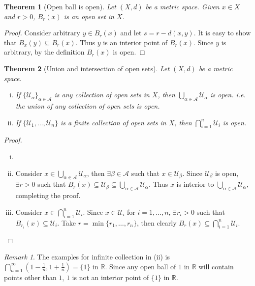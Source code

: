 \documentclass[12pt, lettersize]{book}
\theoremstyle{plain}
\newtheorem{thm}{Theorem}[section]
\theoremstyle{definition}
\theoremstyle{remark}
\newtheorem*{rem}{Remark}
\newcommand{\R}{\mathbb{R}}
\begin{document}
		\begin{thm}[Open ball is open]
			Let $(X,d)$ be a metric space. Given $x\in X$ and $r>0$, $B_r(x)$ is an open set in $X$.
		\end{thm}
		\begin{proof}
			Consider arbitrary $y\in B_r(x)$ and let $s=r-d(x,y)$. It is easy to show that $B_x(y)\subseteq B_r(x)$. Thus $y$ is an interior point of $B_r(x)$. Since $y$ is arbitrary, by the definition $B_r(x)$ is open.
		\end{proof}
		
		\begin{thm}[Union and intersection of open sets]\label{thm: Union and intersection of open sets}
			Let $(X,d)$ be a metric space.
			\begin{enumerate}[(i)]
				\item If $\{\mathcal{U}_\alpha\}_{\alpha\in \mathcal{A}}$ is any collection of open sets in $X$, then $\bigcup_{\alpha\in \mathcal{A}}\mathcal{U}_\alpha$ is open. i.e. the union of \emph{any} collection of open sets is open.
				\item If $\{\mathcal{U}_1,\dots,\mathcal{U}_n\}$ is a finite collection of open sets in $X$, then $\bigcap_{i=1}^{n}\mathcal{U}_i$ is open.
			\end{enumerate}
		\end{thm}
		\begin{proof}
			\begin{enumerate}[(i)]
				\item[]
				\item Consider $x\in\bigcup_{\alpha\in \mathcal{A}}\mathcal{U}_\alpha$, then $\exists \beta\in\mathcal{A}$ such that $x\in\mathcal{U}_\beta$. Since $\mathcal{U}_\beta$ is open, $\exists r>0$ such that $B_r(x)\subseteq\mathcal{U}_\beta\subseteq\bigcup_{\alpha\in \mathcal{A}}\mathcal{U}_\alpha$. Thus $x$ is interior to $\bigcup_{\alpha\in \mathcal{A}}\mathcal{U}_\alpha$, completing the proof.
				\item Consider $x\in\bigcap_{i=1}^{n}\mathcal{U}_i$. Since $x\in\mathcal{U}_i$ for $i=1,\dots,n$, $\exists r_i>0$ such that $B_{r_i}(x)\subseteq\mathcal{U}_i$. Take $r=\min\{r_1,\dots,r_n\}$, then clearly $B_r(x)\subseteq\bigcap_{i=1}^{n}\mathcal{U}_i$.
			\end{enumerate}
		\end{proof}
		\begin{rem}
			The examples for infinite collection in (ii) is $\bigcap_{n=1}^{\infty}(1-\frac{1}{n}, 1+\frac{1}{n})=\{1\}$ in $\R$. Since any open ball of $1$ in $\R$ will contain points other than $1$, $1$ is not an interior point of $\{1\}$ in $\R$.  
		\end{rem}
		
\end{document}
